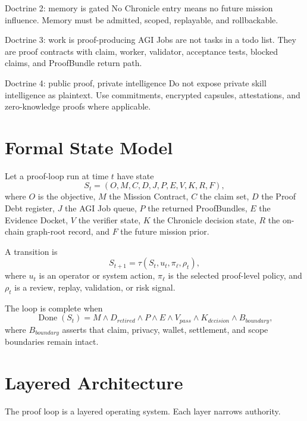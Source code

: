 \documentclass[11pt]{article}
\begin{document}
\begin{greenbox}{Doctrine 2: memory is gated}
No Chronicle entry means no future mission influence. Memory must be admitted, scoped, replayable, and rollbackable.
\end{greenbox}

\begin{greenbox}{Doctrine 3: work is proof-producing}
AGI Jobs are not tasks in a todo list. They are proof contracts with claim, worker, validator, acceptance tests, blocked claims, and ProofBundle return path.
\end{greenbox}

\begin{greenbox}{Doctrine 4: public proof, private intelligence}
Do not expose private skill intelligence as plaintext. Use commitments, encrypted capsules, attestations, and zero-knowledge proofs where applicable.
\end{greenbox}

\section{Formal State Model}
Let a proof-loop run at time $t$ have state
\begin{equation}
S_t=(O,M,C,D,J,P,E,V,K,R,F),
\end{equation}
where $O$ is the objective, $M$ the Mission Contract, $C$ the claim set, $D$ the Proof Debt register, $J$ the AGI Job queue, $P$ the returned ProofBundles, $E$ the Evidence Docket, $V$ the verifier state, $K$ the Chronicle decision state, $R$ the on-chain graph-root record, and $F$ the future mission prior.

A transition is
\begin{equation}
S_{t+1}=\tau(S_t,u_t,\pi_\ell,\rho_t),
\end{equation}
where $u_t$ is an operator or system action, $\pi_\ell$ is the selected proof-level policy, and $\rho_t$ is a review, replay, validation, or risk signal.

The loop is complete when
\begin{equation}
\operatorname{Done}(S_t)= M \wedge D_{retired} \wedge P \wedge E \wedge V_{pass} \wedge K_{decision} \wedge B_{boundary},
\end{equation}
where $B_{boundary}$ asserts that claim, privacy, wallet, settlement, and scope boundaries remain intact.

\section{Layered Architecture}
The proof loop is a layered operating system. Each layer narrows authority.
\end{document}
